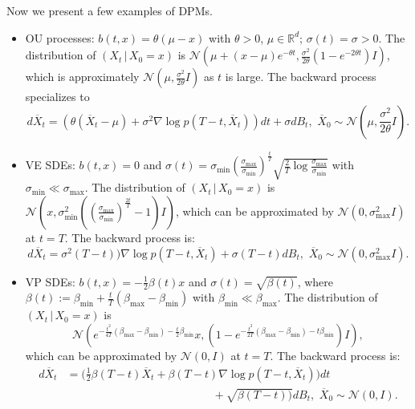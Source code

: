 \documentclass[letterpaper,11pt,reqno]{amsart}
\numberwithin{equation}{section}
\begin{document}
\quad Now we present a few examples of DPMs. 
\begin{itemize}[itemsep = 3 pt]
\item
OU processes: $b(t,x) = \theta (\mu - x)$ with $\theta > 0$, $\mu \in \mathbb{R}^d$; 
$\sigma(t) = \sigma > 0$.
The distribution of $(X_t \,|\, X_0 = x)$ is 
$\mathcal{N}(\mu + (x - \mu) e^{-\theta t}, \frac{\sigma^2}{2\theta} (1 - e^{-2 \theta t}) I)$,
which is approximately 
$\mathcal{N}(\mu, \frac{\sigma^2}{2 \theta} I)$ as $t$ is large.
The backward process specializes to
\begin{equation}
\label{eq:OUrev2}
d\overline{X}_t = (\theta(\overline{X}_t - \mu) + \sigma^2 \nabla \log p(T-t, \overline{X}_t)) dt  + \sigma dB_t, 
\,\, \overline{X}_0 \sim \mathcal{N}\left(\mu, \frac{\sigma^2}{2 \theta} I\right).
\end{equation}
\item
VE SDEs:
$b(t,x) = 0$ and 
$\sigma(t) = \sigma_{\min} \left(\frac{\sigma_{\max}}{\sigma_{\min}} \right)^{\frac{t}{T}} \sqrt{\frac{2}{T} \log \frac{\sigma_{\max}}{\sigma_{\min}}}$
with 
$\sigma_{\min} \ll  \sigma_{\max}$.
The distribution of $(X_t \,|\, X_0 = x)$ is $\mathcal{N}\left(x, \sigma^2_{\min}\left( \left(\frac{\sigma_{\max}}{\sigma_{\min}} \right)^{\frac{2t}{T}}- 1 \right) I \right)$, 
which can be approximated by $\mathcal{N}(0, \sigma^2_{\max} I)$ at $t = T$.
The backward process is:
\begin{equation}
\label{eq:VErev2}
d\overline{X}_t  = \sigma^2(T-t) ) \nabla \log p(T-t, \overline{X}_t)+  \sigma(T-t) dB_t, 
\,\, \overline{X}_0 \sim \mathcal{N}(0, \sigma^2_{\max} I).
\end{equation}
\item
VP SDEs: 
$b(t,x) = -\frac{1}{2}\beta(t) x$ and $\sigma(t) = \sqrt{\beta(t)}$,
where 
$\beta(t):= \beta_{\min} + \frac{t}{T}(\beta_{\max} - \beta_{\min})$ with $\beta_{\min} \ll \beta_{\max}$.
The distribution of $(X_t \,|\, X_0 = x)$ is
$$\mathcal{N}( e^{-\frac{t^2}{4T}(\beta_{\max} - \beta_{\min}) - \frac{t}{2} \beta_{\min}}  x,  
(1 -e^{-\frac{t^2}{2T}(\beta_{\max} - \beta_{\min}) - t \beta_{\min}} ) I),$$
which can be approximated by $\mathcal{N}(0,I)$ at $t = T$.
The backward process is:
\begin{equation}
\label{eq:VPrev2}
\begin{aligned}
d\overline{X}_t & = \bigg(\frac{1}{2} \beta(T-t) \overline{X}_t + \beta(T-t) \nabla \log p(T-t, \overline{X}_t)\bigg)  dt \\
& \qquad \qquad \qquad \qquad \qquad \qquad  \quad + \sqrt{\beta(T-t))} dB_t, \,\, \overline{X}_0 \sim \mathcal{N}(0, I).

\end{aligned}
\end{equation}
\end{itemize}
\end{document}
